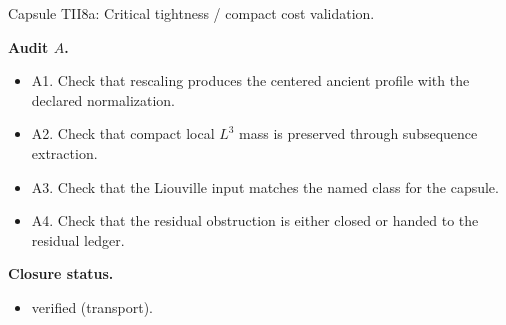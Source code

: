 \documentclass[11pt]{amsart}
\newcommand{\capsulefield}[1]{\par\smallskip\noindent\textbf{#1.}\ }
\begin{document}
\begin{proofcapsule}{Capsule TII8a: Critical tightness / compact cost validation.}
  \capsulefield{Audit \(A\)}
  \begin{itemize}[leftmargin=1.8em]
  \item A1. Check that rescaling produces the centered ancient profile with the declared normalization.
  \item A2. Check that compact local $L^3$ mass is preserved through subsequence extraction.
  \item A3. Check that the Liouville input matches the named class for the capsule.
  \item A4. Check that the residual obstruction is either closed or handed to the residual ledger.
  \end{itemize}
  \capsulefield{Closure status}
  \begin{itemize}[leftmargin=1.8em]
  \item verified (transport).
  \end{itemize}
\end{proofcapsule}
\end{document}
